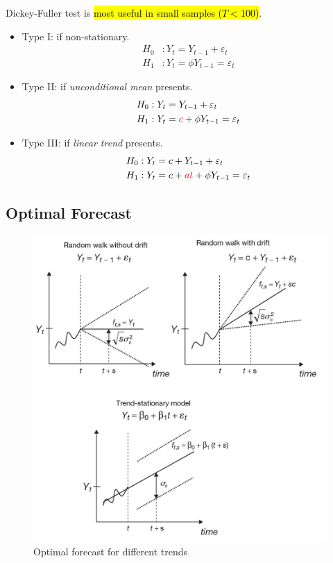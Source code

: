 \documentclass[11pt]{article}
\begin{document}
            \begin{remark}
    	        Dickey-Fuller test is \hl{most useful in small samples ($T<100$)}.
    	    \end{remark}
    	    
    	    \begin{itemize}
    	        \item Type I: if non-stationary.
    	        \begin{align}
    	            H_0 &: Y_t = Y_{t-1} + \varepsilon_t \\
    	            H_1 &: Y_t = \phi Y_{t-1} = \varepsilon_t
    	        \end{align}
    	        \item Type II: if \emph{unconditional mean} presents.
    	        \begin{align}
    	            H_0 &: Y_t = Y_{t-1} + \varepsilon_t \\
    	            H_1 &: Y_t = \textcolor{red}{c} + \phi Y_{t-1} = \varepsilon_t
    	        \end{align}
    	        \item Type III: if \emph{linear trend} presents.
    	        \begin{align}
    	            H_0 &: Y_t = c + Y_{t-1} + \varepsilon_t \\
    	            H_1 &: Y_t = c + \textcolor{red}{at} + \phi Y_{t-1} = \varepsilon_t
    	        \end{align}
    	    \end{itemize}
    	    
    	    \subsection{Optimal Forecast}
    	        \begin{figure}[H]
    	            \centering
    	            \includegraphics[width=0.7\linewidth]{./figures/trend_forecast.png}
    	            \caption{Optimal forecast for different trends}
    	        \end{figure}
	
\end{document}
